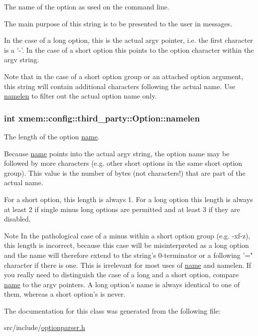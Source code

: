 The name of the option as used on the command line. 

The main purpose of this string is to be presented to the user in messages.

In the case of a long option, this is the actual {\ttfamily argv} pointer, i.\-e. the first character is a '-\/'. In the case of a short option this points to the option character within the {\ttfamily argv} string.

Note that in the case of a short option group or an attached option argument, this string will contain additional characters following the actual name. Use \hyperlink{classxmem_1_1config_1_1third__party_1_1_option_ab9c40a964cbbde704d77407446a76933}{namelen} to filter out the actual option name only. \hypertarget{classxmem_1_1config_1_1third__party_1_1_option_ab9c40a964cbbde704d77407446a76933}{
\subsubsection[{namelen}]{\setlength{\rightskip}{0pt plus 5cm}int xmem\-::config\-::third\-\_\-party\-::\-Option\-::namelen}}\label{classxmem_1_1config_1_1third__party_1_1_option_ab9c40a964cbbde704d77407446a76933}


The length of the option \hyperlink{classxmem_1_1config_1_1third__party_1_1_option_aa73b73027c0a9140aeec654f3fe9aef6}{name}. 

Because \hyperlink{classxmem_1_1config_1_1third__party_1_1_option_aa73b73027c0a9140aeec654f3fe9aef6}{name} points into the actual {\ttfamily argv} string, the option name may be followed by more characters (e.\-g. other short options in the same short option group). This value is the number of bytes (not characters!) that are part of the actual name.

For a short option, this length is always 1. For a long option this length is always at least 2 if single minus long options are permitted and at least 3 if they are disabled.

\begin{DoxyNote}{Note}
In the pathological case of a minus within a short option group (e.\-g. {\ttfamily -\/xf-\/z}), this length is incorrect, because this case will be misinterpreted as a long option and the name will therefore extend to the string's 0-\/terminator or a following '=" character if there is one. This is irrelevant for most uses of \hyperlink{classxmem_1_1config_1_1third__party_1_1_option_aa73b73027c0a9140aeec654f3fe9aef6}{name} and {\ttfamily namelen}. If you really need to distinguish the case of a long and a short option, compare \hyperlink{classxmem_1_1config_1_1third__party_1_1_option_aa73b73027c0a9140aeec654f3fe9aef6}{name} to the {\ttfamily argv} pointers. A long option's {\ttfamily name} is always identical to one of them, whereas a short option's is never. 
\end{DoxyNote}


The documentation for this class was generated from the following file\-:\begin{DoxyCompactItemize}
\item 
src/include/\hyperlink{optionparser_8h}{optionparser.\-h}\end{DoxyCompactItemize}
